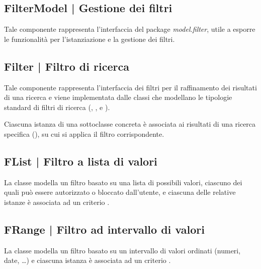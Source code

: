 \documentclass[10pt,a4paper,headinclude,footinclude,hidelinks]{scrreprt} %
\begin{document}
	\subsection[FilterModel]{FilterModel | Gestione dei filtri}
	\label{sec:stage:design:model.filter:filter-manager}
	Tale componente rappresenta l'interfaccia del package \textit{model.filter}, utile a esporre le funzionalità per l'istanziazione e la gestione dei filtri.

	\subsection[Filter]{Filter | Filtro di ricerca}
	\label{sec:stage:design:model.filter:filter}
	Tale componente rappresenta l'interfaccia dei filtri per il raffinamento dei risultati di una ricerca e viene implementata dalle classi che modellano le tipologie standard di filtri di ricerca (\textit{}, \textit{}, \textit{} e \textit{}).
	
	Ciascuna istanza di una sottoclasse concreta è associata ai risultati di una ricerca specifica (\textit{}), su cui si applica il filtro corrispondente.

	\subsection[FList]{FList | Filtro a lista di valori}
	\label{sec:stage:design:model.filter:list-filter}
	La classe \textit{} modella un filtro basato su una lista di possibili valori, ciascuno dei quali può essere autorizzato o bloccato dall'utente, e ciascuna delle relative istanze è associata ad un criterio \textit{}.

	\subsection[FRange]{FRange | Filtro ad intervallo di valori}
	\label{sec:stage:design:model.filter:range-filter}
	La classe \textit{} modella un filtro basato su un intervallo di valori ordinati (numeri, date, \ldots) e ciascuna istanza è associata ad un criterio \textit{}.
\end{document}
